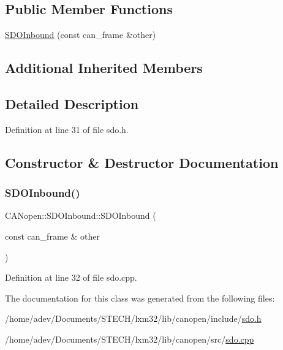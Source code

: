 \subsection*{Public Member Functions}
\begin{DoxyCompactItemize}
\item 
\hyperlink{class_c_a_nopen_1_1_s_d_o_inbound_a9ec2a9d10554f7f47aeaa5d83e048f70}{S\+D\+O\+Inbound} (const can\+\_\+frame \&other)
\end{DoxyCompactItemize}
\subsection*{Additional Inherited Members}


\subsection{Detailed Description}


Definition at line 31 of file sdo.\+h.



\subsection{Constructor \& Destructor Documentation}
\mbox{\label{class_c_a_nopen_1_1_s_d_o_inbound_a9ec2a9d10554f7f47aeaa5d83e048f70}} 
\subsubsection{\texorpdfstring{S\+D\+O\+Inbound()}{SDOInbound()}}
{\footnotesize\ttfamily C\+A\+Nopen\+::\+S\+D\+O\+Inbound\+::\+S\+D\+O\+Inbound (\begin{DoxyParamCaption}\item[{const can\+\_\+frame \&}]{other }\end{DoxyParamCaption})}



Definition at line 32 of file sdo.\+cpp.



The documentation for this class was generated from the following files\+:\begin{DoxyCompactItemize}
\item 
/home/adev/\+Documents/\+S\+T\+E\+C\+H/lxm32/lib/canopen/include/\hyperlink{sdo_8h}{sdo.\+h}\item 
/home/adev/\+Documents/\+S\+T\+E\+C\+H/lxm32/lib/canopen/src/\hyperlink{sdo_8cpp}{sdo.\+cpp}\end{DoxyCompactItemize}

